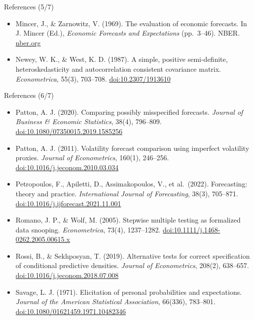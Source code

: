 \begin{frame}{References (5/7)}
\begin{itemize}
    \item Mincer, J., \& Zarnowitz, V. (1969). The evaluation of economic forecasts. In J. Mincer (Ed.), \textit{Economic Forecasts and Expectations} (pp.\ 3--46). NBER. \href{https://www.nber.org/books-and-chapters/economic-forecasts-and-expectations-analysis-forecasting-behavior-and-performance/evaluation-economic-forecasts}{nber.org}
    \item Newey, W. K., \& West, K. D. (1987). A simple, positive semi-definite, heteroskedasticity and autocorrelation consistent covariance matrix. \textit{Econometrica}, 55(3), 703--708. \href{https://doi.org/10.2307/1913610}{doi:10.2307/1913610}
\end{itemize}
\end{frame}

\begin{frame}{References (6/7)}
\itemsize{\tiny}
\begin{itemize}
    \item Patton, A. J. (2020). Comparing possibly misspecified forecasts. \textit{Journal of Business \& Economic Statistics}, 38(4), 796--809. \href{https://doi.org/10.1080/07350015.2019.1585256}{doi:10.1080/07350015.2019.1585256}
    \item Patton, A. J. (2011). Volatility forecast comparison using imperfect volatility proxies. \textit{Journal of Econometrics}, 160(1), 246--256. \href{https://doi.org/10.1016/j.jeconom.2010.03.034}{doi:10.1016/j.jeconom.2010.03.034}
    \item Petropoulos, F., Apiletti, D., Assimakopoulos, V., et al.\ (2022). Forecasting: theory and practice. \textit{International Journal of Forecasting}, 38(3), 705--871. \href{https://doi.org/10.1016/j.ijforecast.2021.11.001}{doi:10.1016/j.ijforecast.2021.11.001}
    \item Romano, J. P., \& Wolf, M. (2005). Stepwise multiple testing as formalized data snooping. \textit{Econometrica}, 73(4), 1237--1282. \href{https://doi.org/10.1111/j.1468-0262.2005.00615.x}{doi:10.1111/j.1468-0262.2005.00615.x}
    \item Rossi, B., \& Sekhposyan, T. (2019). Alternative tests for correct specification of conditional predictive densities. \textit{Journal of Econometrics}, 208(2), 638--657. \href{https://doi.org/10.1016/j.jeconom.2018.07.008}{doi:10.1016/j.jeconom.2018.07.008}
    \item Savage, L. J. (1971). Elicitation of personal probabilities and expectations. \textit{Journal of the American Statistical Association}, 66(336), 783--801. \href{https://doi.org/10.1080/01621459.1971.10482346}{doi:10.1080/01621459.1971.10482346}

\end{itemize}
\end{frame}
